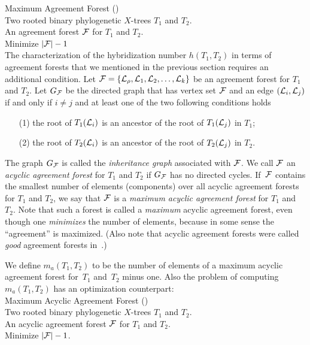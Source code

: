  Maximum Agreement Forest (\maf)\\
 Two rooted binary phylogenetic $X$-trees $T_1$ and $T_2$. \\
 An agreement forest ${\mathcal F}$ for $T_1$ and $T_2$. \\
 Minimize $|{\mathcal F}|-1$ \\


The characterization of the hybridization number $h(T_1,T_2)$ in terms of agreement forests that we mentioned in the previous section requires an additional condition. Let ${\mathcal F}=\{{\mathcal L}_\rho,{\mathcal L}_1,{\mathcal L}_2,\ldots,{\mathcal L}_k\}$ be an agreement forest for $T_1$ and $T_2$. Let $G_{{\mathcal F}}$ be the directed graph that has vertex set ${\mathcal F}$ and an edge $({\mathcal L}_i,{\mathcal L}_j)$ if and only if $i\neq j$ and at least one of the two following conditions holds
\begin{itemize}
\item[(1)] the root of $T_1({\mathcal L}_i)$ is an ancestor of the root of $T_1({\mathcal L}_j)$ in $T_1$;
\item[(2)] the root of $T_2({\mathcal L}_i)$ is an ancestor of the root of $T_2({\mathcal L}_j)$ in $T_2$.
\end{itemize}
The graph $G_{{\mathcal F}}$ is called the {\it inheritance graph} associated with ${\mathcal F}$. We call ${\mathcal F}$ an {\it acyclic agreement forest} for $T_1$ and $T_2$ if $G_{{\mathcal F}}$ has no directed cycles. If~${\mathcal F}$ contains the smallest number of elements (components) over all acyclic agreement forests for $T_1$ and $T_2$, we say that ${\mathcal F}$ is a {\it maximum acyclic agreement forest} for $T_1$ and $T_2$. Note that such a forest is called a \emph{maximum} acyclic agreement forest, even though one \emph{minimizes} the number of elements, because in some sense the ``agreement'' is maximized. (Also note that acyclic agreement forests were called \emph{good} agreement forests in~\cite{baroni05}.)

We define $m_a(T_1, T_2)$ to be the number of elements of a maximum acyclic agreement forest for~$T_1$ and~$T_2$ minus one. Also the problem of computing $m_a(T_1, T_2)$ has an optimization counterpart:\\


 Maximum Acyclic Agreement Forest (\maaf)\\
 Two rooted binary phylogenetic $X$-trees $T_1$ and $T_2$. \\
 An acyclic agreement forest ${\mathcal F}$ for $T_1$ and $T_2$. \\
 Minimize $|{\mathcal F}|-1$.\\


